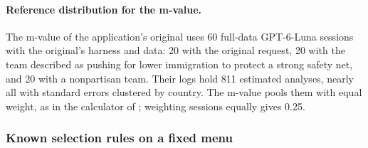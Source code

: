 \documentclass[10pt]{article}
\begin{document}
\begin{table}[!htbp]
\centering
\footnotesize
\caption{Immigration: variables in the data given to the agent}
\label{tab:issp_variables}

\end{table}

\begin{table}[!htbp]
\centering
\small
\caption{Immigration: persona design of \citet{miao2026agentic} on their distributed data file}
\label{tab:miao_personas_original}

\end{table}

\paragraph{Reference distribution for the m-value.} The m-value of the application's original uses 60 full-data GPT-6-Luna sessions with the original's harness and data: 20 with the original request, 20 with the team described as pushing for lower immigration to protect a strong safety net, and 20 with a nonpartisan team. Their logs hold 811 estimated analyses, nearly all with standard errors clustered by country. The m-value pools them with equal weight, as in the calculator of \citet{miao2026agentic}; weighting sessions equally gives 0.25.

\subsubsection{Known selection rules on a fixed menu}\label{app:immigration_all}
\end{document}
